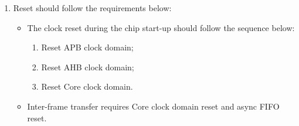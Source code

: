 \documentclass[main\_\_EN.tex]{subfiles}
\begin{document}
\begin{enumerate}
    Here are the specific operation steps in the RX unit:
    \begin{enumerate}
        \item Clear \hyperref[fielddesc:PCRPARLCLKRXEN]{PCR\_PARL\_CLK\_RX\_EN} to turn off RX Core clock domain;
        \item Write 1 to \hyperref[fielddesc:PARLIORXSTART]{PARL\_IO\_RX\_START};
        \item Set \hyperref[fielddesc:PCRPARLCLKRXEN]{PCR\_PARL\_CLK\_RX\_EN} to turn on RX Core clock domain;
        \item Operate the external device to start sending data;
        \item Clear \hyperref[fielddesc:PCRPARLCLKRXEN]{PCR\_PARL\_CLK\_RX\_EN} to turn off RX Core clock domain;
        \item Write 0 to \hyperref[fielddesc:PARLIORXSTART]{PARL\_IO\_RX\_START}.
    \end{enumerate}
    Here are the specific operation steps in the TX unit:
    \begin{enumerate}
        \item Clear \hyperref[fielddesc:PCRPARLCLKTXEN]{PCR\_PARL\_CLK\_TX\_EN} to turn off TX Core clock domain;
        \item Write 1 to \hyperref[fielddesc:PARLIOTXSTART]{PARL\_IO\_TX\_START};
        \item Set \hyperref[fielddesc:PCRPARLCLKTXEN]{PCR\_PARL\_CLK\_TX\_EN} to turn on TX Core clock domain;
        \item Operate the external device to start receiving data;
        \item Clear \hyperref[fielddesc:PCRPARLCLKTXEN]{PCR\_PARL\_CLK\_TX\_EN} to turn off TX Core clock domain;
        \item Write 0 to \hyperref[fielddesc:PARLIOTXSTART]{PARL\_IO\_TX\_START}.
    \end{enumerate}
    
    \item Reset should follow the requirements below:
    \begin{itemize}
        \item The clock reset during the chip start-up should follow the sequence below:
        \begin{enumerate}
            \item Reset APB clock domain;
            \item Reset AHB clock domain;
            \item Reset Core clock domain.
        \end{enumerate}
        \item Inter-frame transfer requires Core clock domain reset and async FIFO reset.
    \end{itemize}
\end{enumerate}
\end{document}
